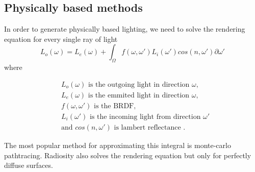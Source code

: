 \documentclass{ACGSeminar}
\begin{document}
	\subsection{Physically based methods}
	In order to generate physically based lighting, we need to solve the rendering equation for every single ray of light
	$$ L_o(\omega) = L_e(\omega) + \int_\Omega f(\omega, \omega')L_i(\omega')cos(n, \omega') \partial \omega' $$
	where 
	\begin{center}
		\begin{align*}
			&L_o(\omega) \text{ is the outgoing light in direction } \omega\text{,}\\
			&L_e(\omega) \text{ is the emmited light in direction } \omega\text{,}\\
			&f(\omega, \omega') \text{ is the BRDF} \text{,}\\
			&L_i(\omega') \text{ is the incoming light from direction } \omega'\\
			&\text{and } cos(n, \omega') \text{ is lambert reflectance}  \text{ .}
		\end{align*}
	\end{center}
	The most popular method for approximating this integral is monte-carlo pathtracing\cite{P2PATH}. Radiosity also solves the rendering equation but only for perfectly diffuse surfaces.
\end{document}
